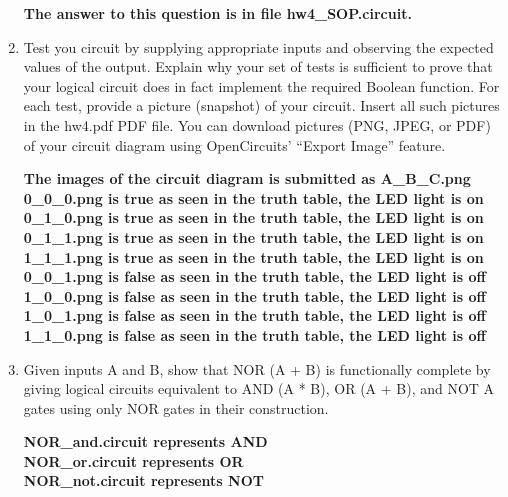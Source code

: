 \documentclass{article}
\begin{document}
\begin{enumerate}
        \begin{center}
            \textbf{The answer to this question is in file hw4\_SOP.circuit.}
        \end{center}
        \item Test you circuit by supplying appropriate inputs and observing the expected values of the
        output. Explain why your set of tests is sufficient to prove that your logical circuit does in
        fact implement the required Boolean function. For each test, provide a picture (snapshot) of
        your circuit. Insert all such pictures in the hw4.pdf PDF file. You can download pictures
        (PNG, JPEG, or PDF) of your circuit diagram using OpenCircuits’ “Export Image” feature.
        \begin{center}
            \textbf{The images of the circuit diagram is submitted as A\_B\_C.png}\\[0.25in]
            \textbf{0\_0\_0.png is true as seen in the truth table, the LED light is on}\\
            \textbf{0\_1\_0.png is true as seen in the truth table, the LED light is on}\\
            \textbf{0\_1\_1.png is true as seen in the truth table, the LED light is on}\\
            \textbf{1\_1\_1.png is true as seen in the truth table, the LED light is on}\\
            \textbf{0\_0\_1.png is false as seen in the truth table, the LED light is off}\\
            \textbf{1\_0\_0.png is false as seen in the truth table, the LED light is off}\\
            \textbf{1\_0\_1.png is false as seen in the truth table, the LED light is off}\\
            \textbf{1\_1\_0.png is false as seen in the truth table, the LED light is off}\\
        \end{center}
        \item Given inputs A and B, show that NOR {(A + B)} is functionally complete by giving logical
        circuits equivalent to AND {(A * B)}, OR {(A + B)}, and NOT {A} gates using only NOR
        gates in their construction.
        \begin{center}
            \textbf{NOR\_and.circuit represents AND}\\
            \textbf{NOR\_or.circuit represents OR}\\
            \textbf{NOR\_not.circuit represents NOT}

\end{center}
\end{enumerate}
\end{document}
